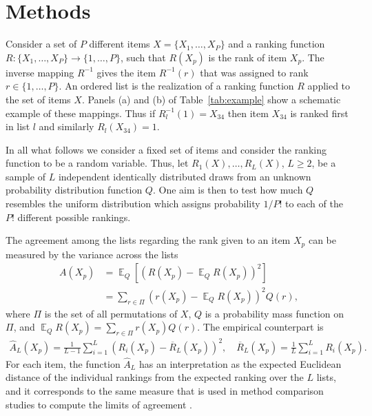 \documentclass[oupdraft]{bio}
\newcommand{\nn}{\nonumber}
\DeclareMathOperator{\E}{\mathbb{E}}
\begin{document}
\section{Methods}

Consider a set of $P$ different items $X=\{X_1,\dots,X_P\}$ and a
ranking function $R: \{X_1,\dots,X_P\}\to \{1,\dots,P\}$, such that
$R(X_p)$ is the rank of item $X_p$. The inverse mapping $R^{-1}$ gives
the item $R^{-1}(r)$ that was assigned to rank $r\in\{1,\dots,P\}$. An
ordered list is the realization of a ranking function $R$ applied to
the set of items $X$.  Panels (a) and (b) of Table~\ref{tab:example}
show a schematic example of these mappings. Thus if
$R_l^{-1}(1)=X_{34}$ then item $X_{34}$ is ranked first in list $l$
and similarly $R_l(X_{34})=1$.

In all what follows we consider a fixed set of items and consider the
ranking function to be a random variable. Thus, let
$R_1(X),\dots,R_L(X)$, $L\geq2$, be a sample of $L$ independent
identically distributed draws from an unknown probability distribution
function $Q$. One aim is then to test how much $Q$ resembles the
uniform distribution which assigns probability $1/P!$ to each of the
$P!$ different possible rankings. 


The agreement among the lists regarding the rank given to an item $X_p$
can be measured by the variance across the lists
\begin{align}
  A(X_p) &= \E_Q\left[\left(R(X_p)-\E_Q R(X_p)\right)^2\right]\\
   &= \sum_{r\in\Pi} \left(r(X_p)-\E_Q R(X_p)\right)^2 Q(r),\nn
\end{align}
where $\Pi$ is the set of all permutations of $X$, $Q$ is a
probability mass function on $\Pi$, and
$\E_Q R(X_p)=\sum_{r\in\Pi} r(X_p)Q(r)$. The empirical counterpart is
\begin{align}
\widehat{A}_L(X_p) = \frac{1}{L-1}\sum_{i=1}^L (R_i(X_p) - \overline{R}_L(X_p))^2, \quad \overline{R}_L(X_p) = \frac{1}{L}\sum_{i=1}^L R_i(X_p).\label{eq:empDistance}
\end{align}
For each item, the function $\widehat{A}_L$ has an interpretation as the expected
Euclidean distance of the individual rankings from the expected
ranking over the $L$ lists, and it corresponds to the same measure
that is used in method comparison studies to compute the limits of
agreement \citep{alt:bland:1983}.
\end{document}
